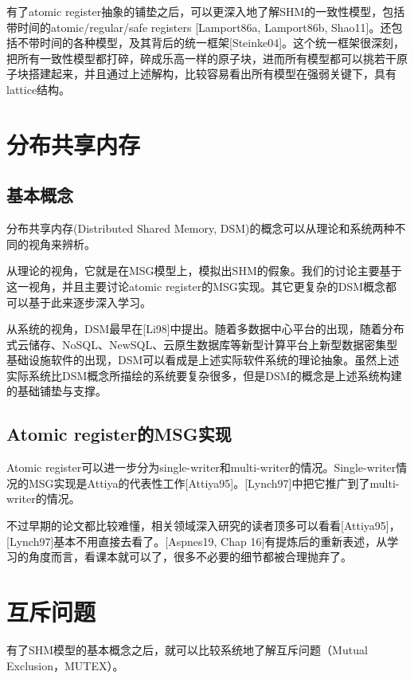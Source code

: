 \documentclass[UTF8]{ctexrep}
\begin{document}
有了atomic register抽象的铺垫之后，可以更深入地了解SHM的一致性模型，包括带时间的atomic/regular/safe registers [Lamport86a, Lamport86b, Shao11]。还包括不带时间的各种模型，及其背后的统一框架[Steinke04]。这个统一框架很深刻，把所有一致性模型都打碎，碎成乐高一样的原子块，进而所有模型都可以挑若干原子块搭建起来，并且通过上述解构，比较容易看出所有模型在强弱关键下，具有lattice结构。


\chapter{分布共享内存}

\section{基本概念}

分布共享内存(Distributed Shared Memory, DSM)的概念可以从理论和系统两种不同的视角来辨析。

从理论的视角，它就是在MSG模型上，模拟出SHM的假象。我们的讨论主要基于这一视角，并且主要讨论atomic register的MSG实现。其它更复杂的DSM概念都可以基于此来逐步深入学习。

从系统的视角，DSM最早在[Li98]中提出。随着多数据中心平台的出现，随着分布式云储存、NoSQL、NewSQL、云原生数据库等新型计算平台上新型数据密集型基础设施软件的出现，DSM可以看成是上述实际软件系统的理论抽象。虽然上述实际系统比DSM概念所描绘的系统要复杂很多，但是DSM的概念是上述系统构建的基础铺垫与支撑。

\section{Atomic register的MSG实现}

Atomic register可以进一步分为single-writer和multi-writer的情况。Single-writer情况的MSG实现是Attiya的代表性工作[Attiya95]。[Lynch97]中把它推广到了multi-writer的情况。

不过早期的论文都比较难懂，相关领域深入研究的读者顶多可以看看[Attiya95]，[Lynch97]基本不用直接去看了。[Aspnes19, Chap 16]有提炼后的重新表述，从学习的角度而言，看课本就可以了，很多不必要的细节都被合理抛弃了。


\chapter{互斥问题}

有了SHM模型的基本概念之后，就可以比较系统地了解互斥问题（Mutual Exclusion，MUTEX）。
\end{document}
